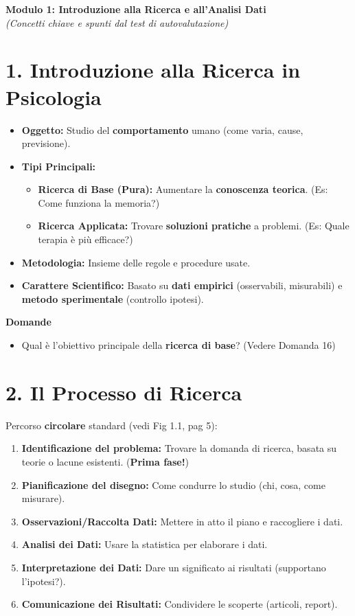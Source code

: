\documentclass[12pt, a4paper]{article}
\newenvironment{reflectionbox}{%
    \medskip %
    \begin{framed}\par\noindent
    \textbf{\color{boxtitlecolor}Domande} \par
    \begin{itemize}[leftmargin=*, label=$\blacktriangleright$]
}{%
    \end{itemize}\par
    \end{framed}
    \medskip %
}
\begin{document}
\begin{center}
    \Large\textbf{Modulo 1: Introduzione alla Ricerca e all'Analisi Dati} \\
    \vspace{0.5cm}
    \large\textit{(Concetti chiave e spunti dal test di autovalutazione)}
\end{center}

\section*{1. Introduzione alla Ricerca in Psicologia}
\begin{itemize}
    \item \textbf{Oggetto:} Studio del \textbf{comportamento} umano (come varia, cause, previsione).
    \item \textbf{Tipi Principali:}
        \begin{itemize}
            \item \textbf{Ricerca di Base (Pura):} Aumentare la \textbf{conoscenza teorica}. (Es: Come funziona la memoria?)
            \item \textbf{Ricerca Applicata:} Trovare \textbf{soluzioni pratiche} a problemi. (Es: Quale terapia è più efficace?)
        \end{itemize}
    \item \textbf{Metodologia:} Insieme delle regole e procedure usate.
    \item \textbf{Carattere Scientifico:} Basato su \textbf{dati empirici} (osservabili, misurabili) e \textbf{metodo sperimentale} (controllo ipotesi).
\end{itemize}

\begin{reflectionbox}
    \item Qual è l'obiettivo principale della \textbf{ricerca di base}? (Vedere Domanda 16)
\end{reflectionbox}

\section*{2. Il Processo di Ricerca}
Percorso \textbf{circolare} standard (vedi Fig 1.1, pag 5):
\begin{enumerate}
    \item \textbf{Identificazione del problema:} Trovare la domanda di ricerca, basata su teorie o lacune esistenti. (\textbf{Prima fase!})
    \item \textbf{Pianificazione del disegno:} Come condurre lo studio (chi, cosa, come misurare).
    \item \textbf{Osservazioni/Raccolta Dati:} Mettere in atto il piano e raccogliere i dati.
    \item \textbf{Analisi dei Dati:} Usare la statistica per elaborare i dati.
    \item \textbf{Interpretazione dei Dati:} Dare un significato ai risultati (supportano l'ipotesi?).
    \item \textbf{Comunicazione dei Risultati:} Condividere le scoperte (articoli, report).
\end{enumerate}
\end{document}

